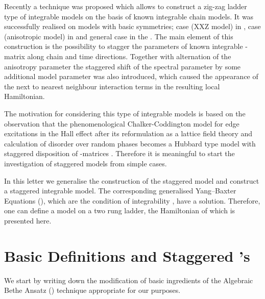 \documentclass[a4paper,11pt]{article}
\begin{document}
Recently a technique was proposed \cite{APSS} which allows 
to construct a zig-zag ladder type of integrable models on the basis
of known integrable chain models. It was successfully
realised on models with basic \coordHE{} symmetries; \coordHE{} case
(XXZ model) in \cite{APSS}, \coordHE{} case (anisotropic \coordHE{} model)
in \cite{TS} and general \coordHE{} case in the  \cite{ASSS}.
The main element of this construction is the possibility to stagger
the parameters of known integrable \coordHE{}-matrix along chain and time
directions. Together with alternation of the anisotropy parameter
\myHighlight{$\Delta$}\coordHE{} \cite{APSS, TS} the staggered shift of the spectral
parameter \coordHE{} by some additional model parameter \myHighlight{$\theta$}\coordHE{} was
also introduced, which caused the appearance of the next to nearest
neighbour interaction terms in the resulting local Hamiltonian.

The motivation for considering this type of integrable models
is based on the observation that the phenomenological
Chalker-Coddington model \cite{CC} for edge excitations in the Hall
effect after its reformulation as a lattice field theory \cite{AS1}
and calculation of disorder over random phases becomes a Hubbard type
model with staggered disposition of \coordHE{}-matrices \cite{AS2}. Therefore
it is meaningful  to start the investigation of staggered models
from simple cases.

In this letter we generalise the construction of the staggered \coordHE{} 
model and construct a staggered integrable \coordHE{} model. 
The corresponding generalised Yang--Baxter Equations (\coordHE{}),
which are the condition of integrability \cite{B,FT}, have a
solution. Therefore, one can define a model on a two rung ladder, the
Hamiltonian of which is presented here.
\section{Basic Definitions and Staggered \coordHE{}'s}
\setcounter{equation}{0}

\indent

We start by writing down the modification of basic
ingredients
of the Algebraic Bethe Ansatz (\coordHE{}) technique \cite{B, FT}
appropriate for our purposes.
 
\end{document}
